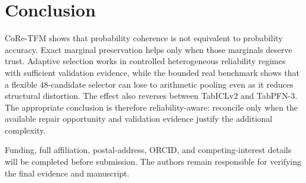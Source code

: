 \documentclass[pdflatex,sn-basic]{sn-jnl}
\theoremstyle{plain}
\begin{document}
\section{Conclusion}\label{sec:conclusion}
CoRe-TFM shows that probability coherence is not equivalent to probability accuracy. Exact marginal preservation helps only when those marginals deserve trust. Adaptive selection works in controlled heterogeneous reliability regimes with sufficient validation evidence, while the bounded real benchmark shows that a flexible 48-candidate selector can lose to arithmetic pooling even as it reduces structural distortion. The effect also reverses between TabICLv2 and TabPFN-3. The appropriate conclusion is therefore reliability-aware: reconcile only when the available repair opportunity and validation evidence justify the additional complexity.

Funding, full affiliation, postal-address, ORCID, and competing-interest details will be completed before submission. The authors remain responsible for verifying the final evidence and manuscript.


\end{document}
